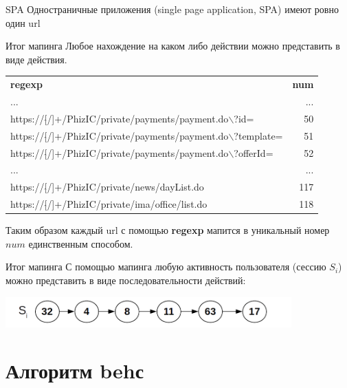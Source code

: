 \begin{frame}{SPA}
	Одностраничные приложения (single page application, SPA)
	имеют ровно один url
	
\end{frame}


\begin{frame}{Итог мапинга}
	\small
	Любое нахождение на каком либо действии можно представить в виде действия.
	
	\begin{tabular}{lr}
		\textbf{regexp} & \textbf{num} \\
		... & ... \\
		https://[$\hat{}$/]+/PhizIC/private/payments/payment.do$\backslash$?id= & 50 \\
		https://[$\hat{}$/]+/PhizIC/private/payments/payment.do$\backslash$?template= & 51 \\
		https://[$\hat{}$/]+/PhizIC/private/payments/payment.do$\backslash$?offerId= & 52 \\
		... & ... \\
		https://[$\hat{}$/]+/PhizIC/private/news/dayList.do & 117 \\
		https://[$\hat{}$/]+/PhizIC/private/ima/office/list.do & 118 \\
	\end{tabular}
	
	Таким образом каждый url с помощью \textbf{regexp} мапится в уникальный 
	номер $num$ единственным способом. 
\end{frame}

\begin{frame}{Итог мапинга}
	С помощью мапинга любую  активность пользователя (сессию $S_i$)
	можно представить в виде последовательности
	действий:
	
	\begin{center}
		\includegraphics[width=11cm]{../pic/beh/chain.png}\centering
	\end{center}
\end{frame}

\section{Алгоритм behс}\label{section:behс}

